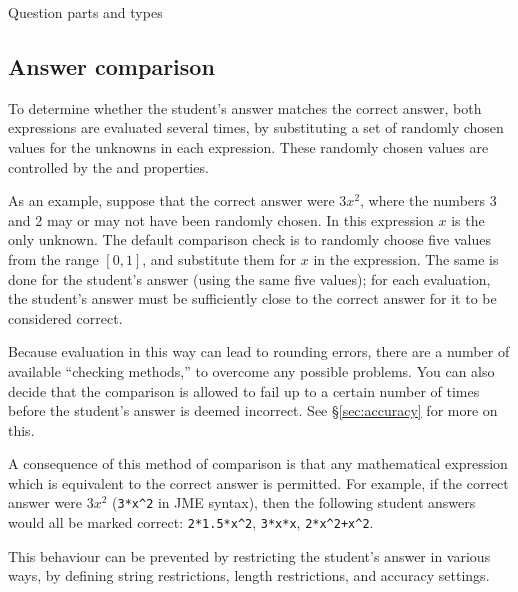 \begin{chapter}{\label{cha:question_parts}Question parts and types}
  \subsection{\label{sec:answer_comparison}Answer comparison}
  To determine whether the student's answer matches the correct answer, both
  expressions are evaluated several times, by substituting a set of randomly
  chosen values for the unknowns in each expression.  These randomly chosen
  values are controlled by the  and
   properties.

  As an example, suppose that the correct answer were $3x^{2}$, where the numbers 3 and 2
  may or may not have been randomly chosen.  In this expression $x$ is the only
  unknown.  The default comparison check is to randomly choose five values from
  the range $[0,1]$, and substitute them for $x$ in the expression.  The same
  is done for the student's answer (using the same five values); for each
  evaluation, the student's answer must be sufficiently close to the correct
  answer for it to be considered correct.

  Because evaluation in this way can lead to rounding errors, there are a
  number of available ``checking methods,'' to overcome any possible problems.
  You can also decide that the comparison is allowed to fail up to a certain
  number of times before the student's answer is deemed incorrect.  See
  \S\ref{sec:accuracy} for more on this.

  A consequence of this method of comparison is that any mathematical
  expression which is equivalent to the correct answer is permitted.  For
  example, if the correct answer were $3x^{2}$ (\verb"3*x^2" in JME syntax),
  then the following student answers would all be marked correct:
  \verb"2*1.5*x^2", \verb"3*x*x", \verb"2*x^2+x^2".

  This behaviour can be prevented by restricting the student's answer in
  various ways, \eg by defining string restrictions, length restrictions, and
  accuracy settings.


\end{chapter}
